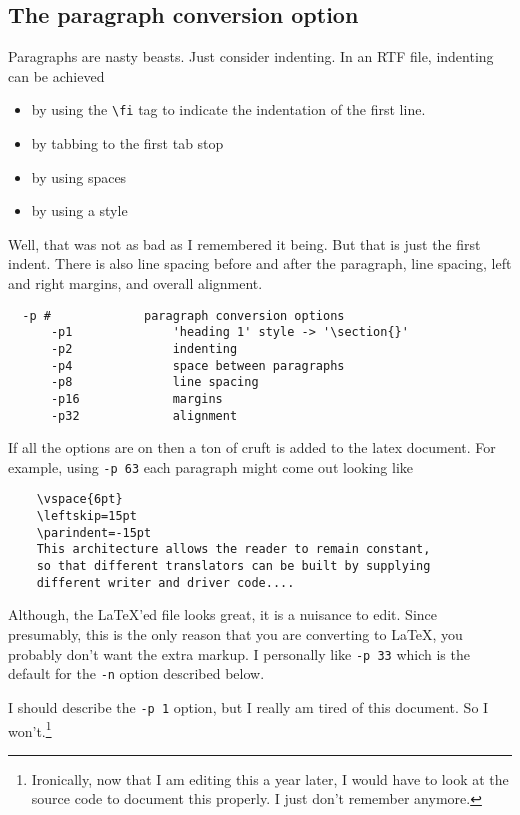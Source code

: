 \documentclass{article}
\begin{document}
\subsection{The paragraph conversion option}

Paragraphs are nasty beasts.  Just consider indenting.  In an RTF
file, indenting can be achieved
\begin{itemize}
\item by using the \verb#\fi# tag to 
indicate the indentation of the first line.  
\item by tabbing to the first tab stop
\item by using spaces
\item by using a style
\end{itemize}
Well, that was not as bad as I remembered it being.  But that is just
the first indent.  There is also line spacing before and after the paragraph,
line spacing, left and right margins, and overall alignment.  
\begin{verbatim}
  -p #             paragraph conversion options
      -p1              'heading 1' style -> '\section{}'
      -p2              indenting
      -p4              space between paragraphs
      -p8              line spacing
      -p16             margins
      -p32             alignment
\end{verbatim}
If all the options are on then a ton of cruft is added to the latex document.
For example, using \texttt{-p 63} each paragraph might come out looking like
\begin{verbatim}
    \vspace{6pt}
    \leftskip=15pt
    \parindent=-15pt
    This architecture allows the reader to remain constant, 
    so that different translators can be built by supplying 
    different writer and driver code....
\end{verbatim}
Although, the \LaTeX{}'ed file looks great, it is a nuisance to
edit.  Since presumably, this is the only reason that you are 
converting to \LaTeX{}, you probably don't want the extra markup.
I personally like \texttt{-p 33} which is the default for the 
\texttt{-n} option described below.

I should describe the \texttt{-p 1} option, but I really am tired
of this document.  So I won't.\footnote{Ironically, now that I am 
editing this a year later, I would have to look at the source code
to document this properly.  I just don't remember anymore.}
\end{document}

